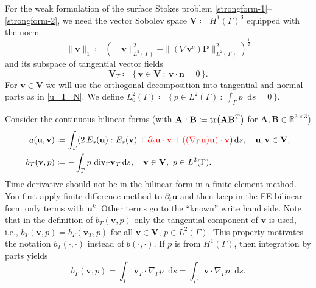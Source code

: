 \documentclass{article}
\newcommand{\vect}[1]{\boldsymbol{\mathbf{#1}}}
\newcommand{\bP}{\mathbf P}
\newcommand{\bV}{\mathbf V}
\newcommand{\bn}{\mathbf n}
\newcommand{\bu}{\mathbf u}
\newcommand{\bv}{\mathbf v}
\newcommand{\divG}{{\mathop{\,\rm div}}_{\Gamma}}
\newcommand{\gradG}{\nabla_{\Gamma}}
\newcommand*\diff{\mathop{}\!\mathrm{d}}
\begin{document}
For the weak formulation of the surface Stokes problem \eqref{strongform-1}--\eqref{strongform-2},
we need the vector Sobolev space $\bV\coloneqq  H^1(\Gamma)^3$ equipped with the norm
\begin{equation} \label{H1norm}
	\|\bv\|_{1}\coloneqq \left(\|\bv\|^2_{L^2(\Gamma)} + \|(\nabla\bv^e)\bP\|^2_{L^2(\Gamma)}\right)^{\frac12}
\end{equation}
and its subspace of tangential vector fields
\begin{equation}   \label{defVT}
 \bV_T\coloneqq  \{\, \bv \in \bV\::\: \bv\cdot \bn =0\,\}.
\end{equation}
For $\bv \in \bV$ we will use the orthogonal decomposition into tangential and normal parts
as in \eqref{u_T_N}.
We define $L_0^2(\Gamma)\coloneqq \{\,p \in L^2(\Gamma)\::\:\int_\Gamma p \diff{s} = 0\,\}$.

Consider the continuous bilinear forms (with $\vect A : \vect B \coloneqq {\rm tr}\big(\vect A \vect B^T\big)$ for  $\vect A, \vect B\in\mathbb{R}^{3\times3}$)
\begin{align}
a(\bu,\bv) &\coloneqq \int_\Gamma (2\,E_s(\bu):E_s(\bv)+{\color{red}\partial_t\mathbf{u}\cdot \bv+ ((\nabla_\Gamma \mathbf{u})\mathbf{u})\cdot \bv}) \diff{s}, \quad \bu,\bv \in \bV, \label{defblfa} \\
b_T(\bv,p) &\coloneqq -\int_\Gamma p\,\divG \bv_T \diff{s},  \quad \bv \in \bV, ~p \in L^2(\Gamma). \label{defblfb}
\end{align}
{\color{blue}
Time derivative should not be in the bilinear form in a finite element method. You first apply finite difference method to $\partial_t\mathbf{u}$ and then keep in the FE bilinear form only terms with $\mathbf{u}^k$. Other terms go to the ``known'' write hand side.
}
Note that in the definition of $b_T(\bv,p)$ only the {tangential} component of $\bv$ is used, i.e., $b_T(\bv,p)=b_T(\bv_T,p)$ for all $\bv \in \bV$, $p\in L^2(\Gamma)$. This property motivates the notation $b_T(\cdot,\cdot)$ instead of $b(\cdot,\cdot)$.
If $p$ is from $H^1(\Gamma)$, then integration by parts yields
\begin{equation}\label{Bform}
b_T(\bv,p)=\int_\Gamma  \bv_T\cdot \gradG p \diff{s} = \int_\Gamma  \bv \cdot \gradG p \diff{s}.
\end{equation}
\end{document}

